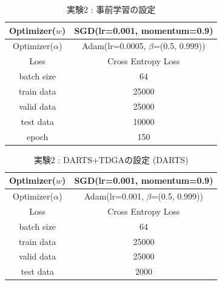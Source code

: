 \begin{table}[tb]
  \begin{center}
    \caption{実験2 : 事前学習の設定}
  	\vspace{3mm}
    \begin{tabular}{|c|c|} \hline
      Optimizer($w$) & SGD(lr=0.001, momentum=0.9) \\ \hline
      Optimizer($\alpha$) & Adam(lr=0.0005, $\beta$=(0.5, 0.999)) \\ \hline
      Loss & Cross Entropy Loss \\ \hline
      batch size & 64 \\ \hline
      train data & 25000\\ \hline
      valid data & 25000\\ \hline
      test data &  10000\\ \hline
      epoch & 150\\ \hline
    \end{tabular}
    \label{tab:setting_pretrain}
  \end{center}
\end{table}

\begin{table}[t]
  \begin{center}
    \caption{実験2 : DARTS+TDGAの設定 (DARTS)}
  	\vspace{3mm}
    \begin{tabular}{|c|c|} \hline
      Optimizer($w$) & SGD(lr=0.001, momentum=0.9) \\ \hline
      Optimizer($\alpha$) & Adam(lr=0.001, $\beta$=(0.5, 0.999)) \\ \hline
      Loss & Cross Entropy Loss \\ \hline
      batch size & 64 \\ \hline
      train data & 25000\\ \hline
      valid data & 25000\\ \hline
      test data &  2000\\ \hline
    \end{tabular}
    \label{tab:setting_darts}
  \end{center}
\end{table}

